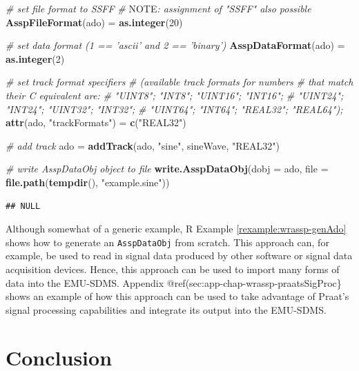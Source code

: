 \documentclass[]{book}
\newenvironment{Shaded}{\begin{snugshade}}{\end{snugshade}}
\newcommand{\AlertTok}[1]{\textcolor[rgb]{0.94,0.16,0.16}{#1}}
\newcommand{\CommentTok}[1]{\textcolor[rgb]{0.56,0.35,0.01}{\textit{#1}}}
\newcommand{\DataTypeTok}[1]{\textcolor[rgb]{0.13,0.29,0.53}{#1}}
\newcommand{\DecValTok}[1]{\textcolor[rgb]{0.00,0.00,0.81}{#1}}
\newcommand{\KeywordTok}[1]{\textcolor[rgb]{0.13,0.29,0.53}{\textbf{#1}}}
\newcommand{\NormalTok}[1]{#1}
\newcommand{\StringTok}[1]{\textcolor[rgb]{0.31,0.60,0.02}{#1}}
\theoremstyle{definition}
\theoremstyle{definition}
\theoremstyle{definition}
\theoremstyle{remark}
\begin{document}
\begin{Shaded}
\begin{Highlighting}[]
\CommentTok{# set file format to SSFF}
\CommentTok{# }\AlertTok{NOTE}\CommentTok{: assignment of "SSFF" also possible}
\KeywordTok{AsspFileFormat}\NormalTok{(ado) =}\StringTok{ }\KeywordTok{as.integer}\NormalTok{(}\DecValTok{20}\NormalTok{)}

\CommentTok{# set data format (1 == 'ascii' and 2 == 'binary')}
\KeywordTok{AsspDataFormat}\NormalTok{(ado) =}\StringTok{ }\KeywordTok{as.integer}\NormalTok{(}\DecValTok{2}\NormalTok{)}

\CommentTok{# set track format specifiers}
\CommentTok{# (available track formats for numbers}
\CommentTok{# that match their C equivalent are:}
\CommentTok{# "UINT8"; "INT8"; "UINT16"; "INT16";}
\CommentTok{# "UINT24"; "INT24"; "UINT32"; "INT32";}
\CommentTok{# "UINT64"; "INT64"; "REAL32"; "REAL64");}
\KeywordTok{attr}\NormalTok{(ado, }\StringTok{"trackFormats"}\NormalTok{) =}\StringTok{ }\KeywordTok{c}\NormalTok{(}\StringTok{"REAL32"}\NormalTok{)}

\CommentTok{# add track}
\NormalTok{ado =}\StringTok{ }\KeywordTok{addTrack}\NormalTok{(ado, }\StringTok{"sine"}\NormalTok{, sineWave, }\StringTok{"REAL32"}\NormalTok{)}

\CommentTok{# write AsspDataObj object to file}
\KeywordTok{write.AsspDataObj}\NormalTok{(}\DataTypeTok{dobj =}\NormalTok{ ado,}
                  \DataTypeTok{file =} \KeywordTok{file.path}\NormalTok{(}\KeywordTok{tempdir}\NormalTok{(), }\StringTok{"example.sine"}\NormalTok{))}
\end{Highlighting}
\end{Shaded}

\begin{verbatim}
## NULL
\end{verbatim}

Although somewhat of a generic example, R Example
\ref{rexample:wrassp-genAdo} shows how to generate an
\texttt{AsspDataObj} from scratch. This approach can, for example, be
used to read in signal data produced by other software or signal data
acquisition devices. Hence, this approach can be used to import many
forms of data into the EMU-SDMS. Appendix
@ref(sec:app-chap-wrassp-praatsSigProc\} shows an example of how this
approach can be used to take advantage of Praat's signal processing
capabilities and integrate its output into the EMU-SDMS.

\hypertarget{conclusion-4}{%
\section{Conclusion}\label{conclusion-4}}
\end{document}
